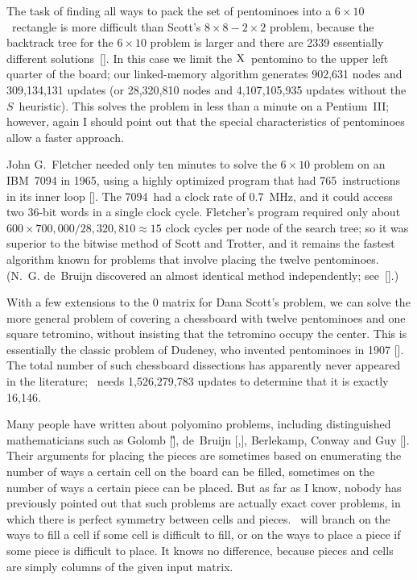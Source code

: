 The task of finding all ways to pack the set of pentominoes into a
$6\times 10$~rectangle is more difficult than Scott's
$8\times8-2\times2$ problem, because the backtrack tree for the
$6\times 10$ problem is larger and there are 2339 essentially different
solutions~[\HH].  In this case we limit the $\rm X$~pentomino to the upper
left quarter of the board; our linked-memory algorithm generates 902{,}631
nodes and 309{,}134{,}131 updates (or 28{,}320{,}810 nodes and
4{,}107{,}105{,}935 updates without the $S$~heuristic).  This solves
the problem in less than a minute on a Pentium~III; however, again I
should point out that the special characteristics of pentominoes allow
a faster approach.

John G.\ Fletcher needed only ten minutes to solve
the $6\times10$ problem on an IBM~7094 in 1965, using a highly optimized program
that had 765~instructions in its inner loop [\Fle].  The 7094~had a clock
rate of 0.7~MHz, and it could access two 36-bit words in a single
clock cycle.  Fletcher's program required only about $600\times
700{,}000/28{,}320{,}810\approx 15$ clock cycles per node of the
search tree; so it
was superior to the bitwise method of Scott and Trotter, and it
remains the fastest algorithm known for problems that involve placing
the twelve pentominoes. (N.~G. de~Bruijn discovered an almost identical
method independently; see~[\deBe].)

With a few extensions to the 0 matrix for Dana Scott's problem, we
can solve the more general problem of covering a chessboard with twelve
pentominoes and one square tetromino, without insisting that the
tetromino occupy the center.  This is essentially the classic problem
of Dudeney, who invented pentominoes in 1907 [\D].  The total number
of such chessboard dissections has apparently never appeared in the
literature; \algoDLX\ needs 1{,}526{,}279{,}783 updates to determine
that it is exactly 16{,}146.

Many people have written about polyomino problems, including
distinguished mathematicians such as Golomb [\G],
de~Bruijn [\deBe,\thinspace\deB],
Berlekamp, Conway and Guy [\BGC].  Their arguments for placing the
pieces are sometimes based on enumerating the number of ways a certain
cell on the board can be filled, sometimes on the number of ways a
certain piece can be placed.  But as far as I know, nobody has
previously pointed out that such problems are actually exact cover
problems, in which there is perfect symmetry between cells and pieces.
\AlgoDLX\ will branch on the ways to fill a cell if some cell is
difficult to fill, or on the ways to place a piece if some piece is
difficult to place.  It knows no difference, because pieces and cells
are simply columns of the given input matrix.

